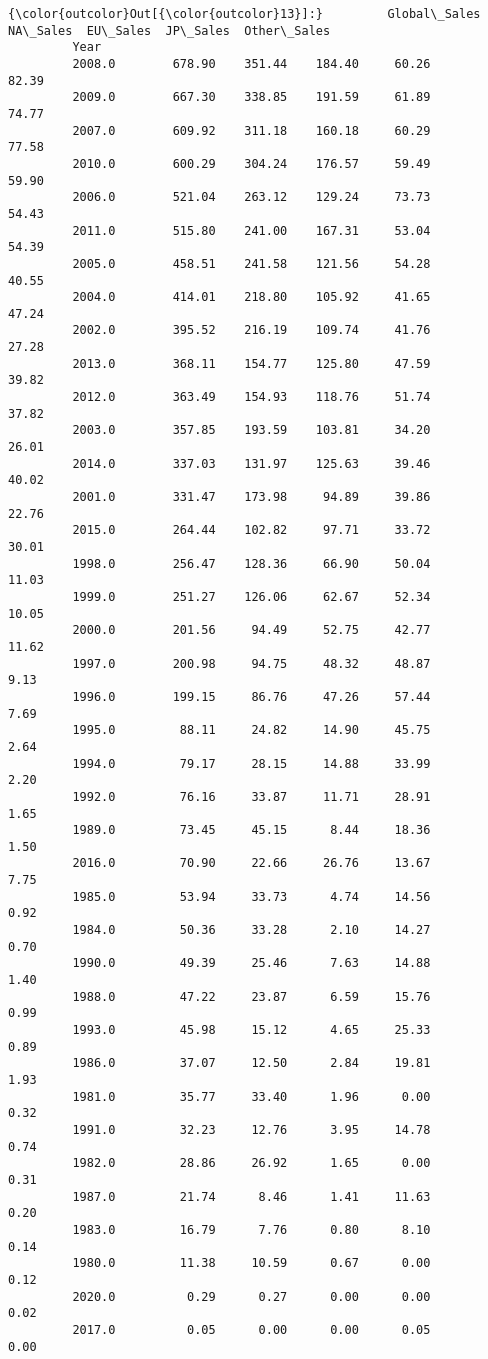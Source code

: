 \documentclass[11pt]{article}
\begin{document}
\begin{Verbatim}[commandchars=\\\{\}]
{\color{outcolor}Out[{\color{outcolor}13}]:}         Global\_Sales  NA\_Sales  EU\_Sales  JP\_Sales  Other\_Sales
         Year                                                           
         2008.0        678.90    351.44    184.40     60.26        82.39
         2009.0        667.30    338.85    191.59     61.89        74.77
         2007.0        609.92    311.18    160.18     60.29        77.58
         2010.0        600.29    304.24    176.57     59.49        59.90
         2006.0        521.04    263.12    129.24     73.73        54.43
         2011.0        515.80    241.00    167.31     53.04        54.39
         2005.0        458.51    241.58    121.56     54.28        40.55
         2004.0        414.01    218.80    105.92     41.65        47.24
         2002.0        395.52    216.19    109.74     41.76        27.28
         2013.0        368.11    154.77    125.80     47.59        39.82
         2012.0        363.49    154.93    118.76     51.74        37.82
         2003.0        357.85    193.59    103.81     34.20        26.01
         2014.0        337.03    131.97    125.63     39.46        40.02
         2001.0        331.47    173.98     94.89     39.86        22.76
         2015.0        264.44    102.82     97.71     33.72        30.01
         1998.0        256.47    128.36     66.90     50.04        11.03
         1999.0        251.27    126.06     62.67     52.34        10.05
         2000.0        201.56     94.49     52.75     42.77        11.62
         1997.0        200.98     94.75     48.32     48.87         9.13
         1996.0        199.15     86.76     47.26     57.44         7.69
         1995.0         88.11     24.82     14.90     45.75         2.64
         1994.0         79.17     28.15     14.88     33.99         2.20
         1992.0         76.16     33.87     11.71     28.91         1.65
         1989.0         73.45     45.15      8.44     18.36         1.50
         2016.0         70.90     22.66     26.76     13.67         7.75
         1985.0         53.94     33.73      4.74     14.56         0.92
         1984.0         50.36     33.28      2.10     14.27         0.70
         1990.0         49.39     25.46      7.63     14.88         1.40
         1988.0         47.22     23.87      6.59     15.76         0.99
         1993.0         45.98     15.12      4.65     25.33         0.89
         1986.0         37.07     12.50      2.84     19.81         1.93
         1981.0         35.77     33.40      1.96      0.00         0.32
         1991.0         32.23     12.76      3.95     14.78         0.74
         1982.0         28.86     26.92      1.65      0.00         0.31
         1987.0         21.74      8.46      1.41     11.63         0.20
         1983.0         16.79      7.76      0.80      8.10         0.14
         1980.0         11.38     10.59      0.67      0.00         0.12
         2020.0          0.29      0.27      0.00      0.00         0.02
         2017.0          0.05      0.00      0.00      0.05         0.00
\end{Verbatim}
            
\end{document}
